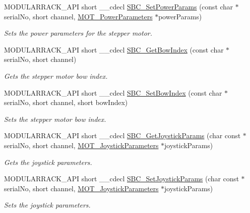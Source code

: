 \begin{DoxyCompactItemize}
M\+O\+D\+U\+L\+A\+R\+R\+A\+C\+K\+\_\+\+A\+PI short \+\_\+\+\_\+cdecl \hyperlink{group___modular_stepper_gad8da5f278adc2fac35bdaaca06288e3c}{S\+B\+C\+\_\+\+Set\+Power\+Params} (const char $\ast$serial\+No, short channel, \hyperlink{struct_m_o_t___power_parameters}{M\+O\+T\+\_\+\+Power\+Parameters} $\ast$power\+Params)
\begin{DoxyCompactList}\small\item\em Sets the power parameters for the stepper motor. \end{DoxyCompactList}\item 
M\+O\+D\+U\+L\+A\+R\+R\+A\+C\+K\+\_\+\+A\+PI short \+\_\+\+\_\+cdecl \hyperlink{group___modular_stepper_gaa6826450924748c858b6694c5b5605d2}{S\+B\+C\+\_\+\+Get\+Bow\+Index} (const char $\ast$serial\+No, short channel)
\begin{DoxyCompactList}\small\item\em Gets the stepper motor bow index. \end{DoxyCompactList}\item 
M\+O\+D\+U\+L\+A\+R\+R\+A\+C\+K\+\_\+\+A\+PI short \+\_\+\+\_\+cdecl \hyperlink{group___modular_stepper_gaf7d50b150c4e0fddc6111567a94227c2}{S\+B\+C\+\_\+\+Set\+Bow\+Index} (const char $\ast$serial\+No, short channel, short bow\+Index)
\begin{DoxyCompactList}\small\item\em Sets the stepper motor bow index. \end{DoxyCompactList}\item 
M\+O\+D\+U\+L\+A\+R\+R\+A\+C\+K\+\_\+\+A\+PI short \+\_\+\+\_\+cdecl \hyperlink{group___modular_stepper_ga204935e2557f94d45ff42b5f39e998f3}{S\+B\+C\+\_\+\+Get\+Joystick\+Params} (char const $\ast$serial\+No, short channel, \hyperlink{struct_m_o_t___joystick_parameters}{M\+O\+T\+\_\+\+Joystick\+Parameters} $\ast$joystick\+Params)
\begin{DoxyCompactList}\small\item\em Gets the joystick parameters. \end{DoxyCompactList}\item 
M\+O\+D\+U\+L\+A\+R\+R\+A\+C\+K\+\_\+\+A\+PI short \+\_\+\+\_\+cdecl \hyperlink{group___modular_stepper_ga56ae72d5cce06e5e461f440216b42298}{S\+B\+C\+\_\+\+Set\+Joystick\+Params} (char const $\ast$serial\+No, short channel, \hyperlink{struct_m_o_t___joystick_parameters}{M\+O\+T\+\_\+\+Joystick\+Parameters} $\ast$joystick\+Params)
\begin{DoxyCompactList}\small\item\em Sets the joystick parameters. \end{DoxyCompactList}\item 

\end{DoxyCompactItemize}
